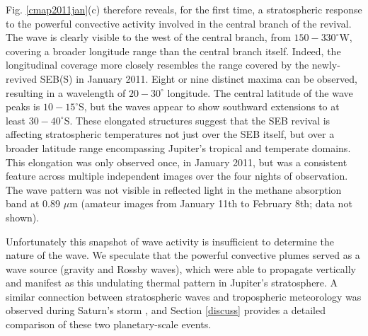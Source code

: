 \documentclass[final,authoryear,5p,times,twocolumn]{elsarticle}
\begin{document}
Fig. \ref{cmap2011jan}(c) therefore reveals, for the first time, a stratospheric response to the powerful convective activity involved in the central branch of the revival.  The wave is clearly visible to the west of the central branch, from $150-330^\circ$W, covering a broader longitude range than the central branch itself.  Indeed, the longitudinal coverage more closely resembles the range covered by the newly-revived SEB(S) in January 2011.  Eight or nine distinct maxima can be observed, resulting in a wavelength of $20-30^\circ$ longitude.  The central latitude of the wave peaks is $10-15^\circ$S, but the waves appear to show southward extensions to at least $30-40^\circ$S.  These elongated structures suggest that the SEB revival is affecting stratospheric temperatures not just over the SEB itself, but over a broader latitude range encompassing Jupiter's tropical and temperate domains.  This elongation was only observed once, in January 2011, but was a consistent feature across multiple independent images over the four nights of observation.  The wave pattern was not visible in reflected light in the methane absorption band at 0.89 $\mu$m (amateur images from January 11th to February 8th; data not shown).

Unfortunately this snapshot of wave activity is insufficient to determine the nature of the wave.  We speculate that the powerful convective plumes served as a wave source (gravity and Rossby waves), which were able to propagate vertically and manifest as this undulating thermal pattern in Jupiter's stratosphere.  A similar connection between stratospheric waves and tropospheric meteorology was observed during Saturn's storm \citep{12fletcher}, and Section \ref{discuss} provides a detailed comparison of these two planetary-scale events.

%
\end{document}

